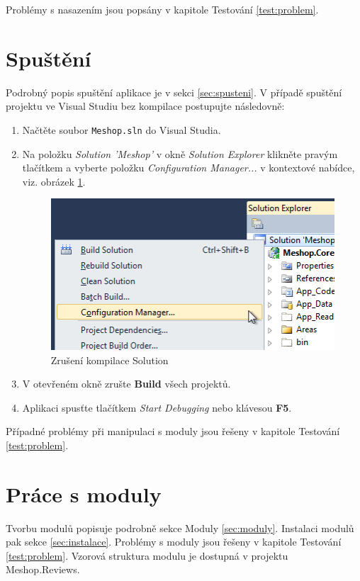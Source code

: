 \documentclass[11pt,twoside,a4paper]{book}
\begin{document}
Problémy s nasazením jsou popsány v kapitole Testování \ref{test:problem}.


\section{Spuštění}
Podrobný popis spuštění aplikace je v sekci \ref{sec:spusteni}. V případě spuštění projektu ve Visual Studiu bez kompilace postupujte následovně:

\begin{enumerate}
\item Načtěte soubor \texttt{Meshop.sln} do Visual Studia.
\item Na položku \textit{Solution 'Meshop'} v okně \textit{Solution Explorer} klikněte pravým tlačítkem a vyberte položku \textit{Configuration Manager...} v kontextové nabídce, viz. obrázek \ref{fig:build}.
 \begin{figure}[h!]
 \begin{center}
 \includegraphics[scale=0.85,angle=0]{figures/build} 
 \caption{Zrušení kompilace Solution}
 \label{fig:build}
 \end{center}
 \end{figure}

\item V otevřeném okně zrušte \textbf{Build} všech projektů.
\item Aplikaci spusťte tlačítkem \textit{Start Debugging} nebo klávesou \textbf{F5}.
\end{enumerate}

Případné problémy při manipulaci s moduly jsou řešeny v kapitole Testování \ref{test:problem}. 

\section{Práce s moduly}
Tvorbu modulů popisuje podrobně sekce Moduly \ref{sec:moduly}. Instalaci modulů pak sekce \ref{sec:instalace}. Problémy s moduly jsou řešeny v kapitole Testování \ref{test:problem}. Vzorová struktura modulu je dostupná v projektu \textsf{Meshop.Reviews}.
\end{document}
